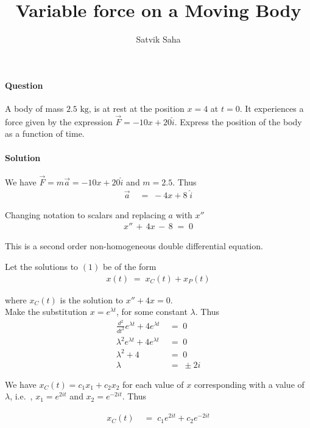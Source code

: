 \documentclass[11pt,reqno]{article}
\title{Variable force on a Moving Body}
\author{Satvik Saha}
\date{}
\begin{document}
\maketitle

\paragraph{Question}
A body of mass $2.5 \text{ kg}$, is at rest at the position $x = 4$ at $t = 0$.
It experiences a force given by the expression $\vec{F} = -10x + 20 \hat{i}$. Express the position of the
body as a function of time.

\paragraph{Solution}
We have $\vec{F} = m\vec{a} = -10x + 20 \hat{i}$ and $m = 2.5$. Thus
\begin{align*}
\vec{a} \;&=\; -4x + 8 \;\hat{i}
\end{align*}

Changing notation to scalars and replacing $a$ with $x''$
\begin{align*}
\boxed{x'' \,+\, 4x \,-\, 8 \;=\; 0} \tag{1}
\end{align*}

This is a second order non-homogeneous double differential equation.

Let the solutions to $(1)$ be of the form 
\begin{align*}
x(t) \;=\; x_C(t) + x_P(t) \tag{2}
\end{align*}

where $x_C(t)$ is the solution to $x'' + 4x = 0$. \\

Make the substitution $x = e^{\lambda t}$, for some constant $\lambda$. Thus
\begin{align*}
\frac{d^2}{dt^2}e^{\lambda t} + 4e^{\lambda t} \;&=\; 0    \\
\lambda^2 e^{\lambda t} + 4e^{\lambda t} \;&=\; 0    \\
\lambda^2 + 4 \;&=\; 0    \\
\lambda \;&=\; \pm 2i
\end{align*}

We have $x_C(t) = c_1x_1 + c_2x_2$ for each value of $x$ corresponding with a value of 
$\lambda$, i.e.\ , $x_1 = e^{2it}$ and $x_2 = e^{-2it}$. Thus

\begin{align*}
x_C(t) \;&=\; c_1 e^{2it} + c_2 e^{-2it}
\end{align*}
\end{document}
